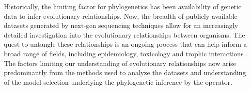 \documentclass[12pt]{article}
\begin{document}

Historically, the limiting factor for phylogenetics has been availability of genetic data to infer evolutionary relationships.
Now, the breadth of publicly available datasets generated by next-gen sequencing techniques allow for an increasingly detailed investigation into the evolutionary relationships between organisms.
The quest to untangle these relationships is an ongoing process that can help inform a broad range of fields, including epidemiology, toxicology and trophic interactions \cite{mctavish2017and}. %
The factors limiting our understanding of evolutionary relationships now arise predominantly from the methods used to analyze the datasets and understanding of the model selection underlying the phylogenetic inference by the operator.
\end{document}
